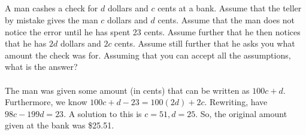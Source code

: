 \documentclass{article}
\begin{document}
\subsection{}
A man cashes a check for $d$ dollars and $c$ cents at a bank.
Assume that the teller by mistake gives the man $c$ dollars and $d$ cents.
Assume that the man does not notice the error until he has spent 23 cents.
Assume further that he then notices that he has $2d$ dollars and $2c$ cents.
Assume still further that he asks you what amount the check was for.
Assuming that you can accept all the assumptions, what is the answer?\\~\\

The man was given some amount (in cents) that can be written as $100c + d$.
Furthermore, we know $100c + d - 23 = 100(2d) + 2c$.
Rewriting, have $98c - 199d = 23$.
A solution to this is $c = 51, d = 25$.
So, the original amount given at the bank was \$25.51.
\end{document}
